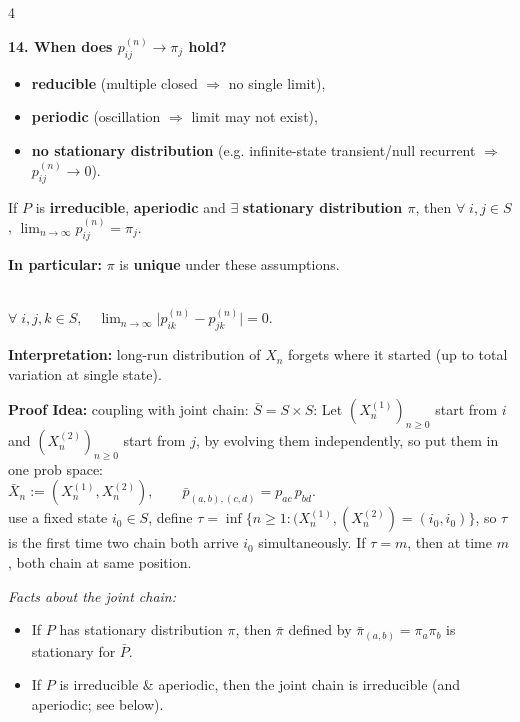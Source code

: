 \documentclass[a4paper, landscape]{article}
\newcommand{\topic}[1]{\par\medskip\textbf{#1}\par}
\newcommand{\subtopic}[1]{\par\textbf{#1}}
\renewcommand{\topic}[1]{\par\medskip\noindent\colorbox{highlightcolor}{\parbox{\dimexpr\columnwidth-2\fboxsep\relax}{\textbf{#1}}}\par}
\renewcommand{\subtopic}[1]{\par\textbf{\color{blue}{#1}}} %
\begin{document}
\begin{multicols}{4}
\topic{14. When does $p^{(n)}_{ij}\to \pi_j$ hold?}
\subtopic{Recall: convergence can fail if:}
\begin{itemize}
  \item \textbf{reducible} (multiple closed $\Rightarrow$ no single limit),
  \item \textbf{periodic} (oscillation $\Rightarrow$ limit may not exist),
  \item \textbf{no stationary distribution} (e.g. infinite-state transient/null recurrent $\Rightarrow$ $p^{(n)}_{ij}\to0$).
\end{itemize}

\subtopic{Main Stationary Theorem:}
If $P$ is \textbf{irreducible}, \textbf{aperiodic} and $\exists$\textbf{ stationary distribution $\pi$},
then $\forall \;i,j\in S$, $\lim_{n\to\infty} p^{(n)}_{ij}=\pi_j.$

\textbf{In particular:} $\pi$ is \textbf{unique} under these assumptions.

\subtopic{Main Lemma: Markov Forgetting:}\\
$\forall \;i,j,k\in S, \quad \lim_{n\to\infty}\bigl|p^{(n)}_{ik}-p^{(n)}_{jk}\bigr|=0$.



\textbf{Interpretation:} long-run distribution of $X_n$ forgets where it started (up to total variation at single state).

\textbf{Proof Idea:} coupling with joint chain: $\bar S=S\times S$:
Let $(X^{(1)}_n)_{n\ge0}$ start from $i$ and $(X^{(2)}_n)_{n\ge0}$ start from $j$, by evolving them independently, so put them in one prob space:\\ $\bar X_n := (X^{(1)}_n,X^{(2)}_n),\qquad
\bar p_{(a,b),(c,d)} = p_{ac}\,p_{bd}.$\\
use a fixed state $i_0\in S$, define $\tau=\inf \{n\geq1:(X_n^{(1)},(X_n^{(2)})=(i_0, i_0)\}$, so $\tau$ is the first time two chain both arrive $i_0$ simultaneously. If $\tau=m$, then at time $m$, both chain at same position.

\textit{Facts about the joint chain:}
\begin{itemize}
  \item If $P$ has stationary distribution $\pi$, then $\bar\pi$ defined by
$\bar\pi_{(a,b)}=\pi_a\pi_b$ is stationary for $\bar P$.
  \item If $P$ is irreducible \& aperiodic, then the joint chain is irreducible (and aperiodic; see below).
\end{itemize}


\end{multicols}
\end{document}
